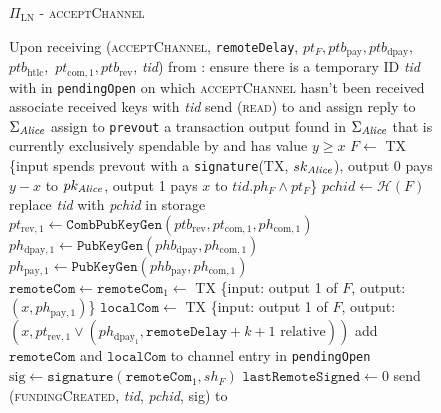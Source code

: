 \begin{figure}[!htbp]
  \begin{protocolbox}{$\Pi_{\mathrm{LN}}$ - \textsc{acceptChannel}}
    \begin{algorithmic}[1]
      \State Upon receiving (\textsc{acceptChannel}, \texttt{remoteDelay},
      $pt_F, ptb_{\mathrm{pay}}, ptb_{\mathrm{dpay}},$ $ptb_{\mathrm{htlc}},$
      $pt_{\mathrm{com}, 1}, ptb_{\mathrm{rev}}$, \textit{tid}) from \bob:
      \Indent
        \State ensure there is a temporary ID \textit{tid} with \bob{} in
        \texttt{pendingOpen} on which \textsc{acceptChannel} hasn't been
        received
        \State associate received keys with \textit{tid}
        \State send (\textsc{read}) to \ledger{} and assign reply to
        $\Sigma_{\mathit{Alice}}$
        \State assign to \texttt{prevout} a transaction output found in
        $\Sigma_{\mathit{Alice}}$ that is currently exclusively spendable by \alice{}
        and has value $y \geq x$
        \State $F \gets$ TX \{input spends prevout with a \texttt{signature}(TX,
        $sk_{\mathit{Alice}}$), output 0 pays $y - x$ to $pk_{\mathit{Alice}}$, output 1 pays
        $x$ to $\textit{tid}.ph_F \wedge pt_F$\}
        \State $\mathit{pchid} \gets \mathcal{H}\left(F\right)$
        \State replace \textit{tid} with \textit{pchid} in storage
        \State $pt_{\mathrm{rev}, 1} \gets
        \mathtt{CombPubKeyGen}\left(ptb_{\mathrm{rev}}, pt_{\mathrm{com}, 1},
        ph_{\mathrm{com}, 1}\right)$
        \State $ph_{\mathrm{dpay}, 1} \gets
        \texttt{PubKeyGen}\left(phb_{\mathrm{dpay}}, ph_{\mathrm{com},
        1}\right)$
        \State $ph_{\mathrm{pay}, 1} \gets
        \texttt{PubKeyGen}\left(phb_{\mathrm{pay}}, ph_{\mathrm{com}, 1}\right)$
        \State $\mathtt{remoteCom} \gets \mathtt{remoteCom}_1 \gets$ TX \{input:
        output 1 of $F$, output: $\left(x, ph_{\mathrm{pay}, 1}\right)$\}
        \State $\mathtt{localCom} \gets$ TX \{input: output 1 of $F$, output:
        $\left(x, pt_{\mathrm{rev}, 1} \vee \left(ph_{\mathrm{dpay}_1},
        \mathtt{remoteDelay} + k + 1 \text{ relative}\right)\right)$
        \State add $\mathtt{remoteCom}$ and $\mathtt{localCom}$ to channel entry
        in \texttt{pendingOpen}
        \State $\mathrm{sig} \gets \mathtt{signature}\left(\mathtt{remoteCom}_1,
        sh_F\right)$
        \State $\mathtt{lastRemoteSigned} \gets 0$
        \State send (\textsc{fundingCreated}, \textit{tid},
        \textit{pchid}, sig) to \bob{}
      \EndIndent
    \end{algorithmic}
  \end{protocolbox}
  \caption{}
  \label{alg:protocol:open:acceptChannel}
\end{figure}

